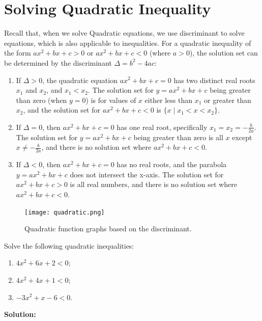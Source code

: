 \documentclass[
	12pt, %
	fleqn, %
	a4paper, %
]{LegrandOrangeBook}
\begin{document}
\section{Solving Quadratic Inequality}
Recall that, when we solve Quadratic equations, we use discriminant to solve equations, which is also applicable to inequalities.
For a quadratic inequality of the form $ax^2 + bx + c > 0$ or $ax^2 + bx + c < 0$ (where $a > 0$), the solution set can be determined by the discriminant $\Delta = b^2 - 4ac$:
\begin{enumerate}
    \item If $\Delta > 0$, the quadratic equation $ax^2 + bx + c = 0$ has two distinct real roots $x_1$ and $x_2$, and $x_1 < x_2$. The solution set for $y = ax^2 + bx + c$ being greater than zero (when $y = 0$) is for values of $x$ either less than $x_1$ or greater than $x_2$, and the solution set for $ax^2 + bx + c < 0$ is $\{ x \mid x_1 < x < x_2 \}$.
    \item If $\Delta = 0$, then $ax^2 + bx + c = 0$ has one real root, specifically $x_1 = x_2 = -\frac{b}{2a}$. The solution set for $y = ax^2 + bx + c$ being greater than zero is all $x$ except $x \neq -\frac{b}{2a}$, and there is no solution set where $ax^2 + bx + c < 0$.
    \item If $\Delta < 0$, then $ax^2 + bx + c = 0$ has no real roots, and the parabola $y = ax^2 + bx + c$ does not intersect the x-axis. The solution set for $ax^2 + bx + c > 0$ is all real numbers, and there is no solution set where $ax^2 + bx + c < 0$.
\end{enumerate}
\begin{figure}[ht!]
    \centering
    \texttt{[image: quadratic.png]}
    \caption{Quadratic function graphs based on the discriminant.}
\end{figure}
\begin{example}
    Solve the following quadratic inequalities:

\begin{enumerate}
    \item \(4x^2 + 6x + 2 < 0\);
    \item \(4x^2 + 4x + 1 < 0\);
    \item \(-3x^2 + x - 6 < 0\).
\end{enumerate}
\end{example}
\textbf{Solution:}
\end{document}
